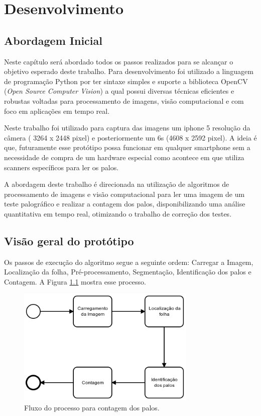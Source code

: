  \chapter{Desenvolvimento}
\label{cap:desenv}

\section{Abordagem Inicial}
\label{sec:abord-ini} 
Neste capítulo será abordado todos os passos realizados para se alcançar o objetivo esperado deste trabalho. Para desenvolvimento foi utilizado a linguagem de programação Python por  ter sintaxe simples e suporte a biblioteca OpenCV (\textit{Open Source Computer Vision}) a qual possui diversas técnicas eficientes  e robustas voltadas para processamento de imagens, visão computacional e com  foco em aplicações em tempo real.

Neste trabalho foi utilizado para captura das imagens um iphone 5 resolução da câmera ( 3264 x 2448 pixel) e posteriormente um 6s (4608 x 2592 pixel). A ideia é que, futuramente esse protótipo possa funcionar em qualquer smartphone sem a necessidade de compra de um hardware especial como acontece em \cite{skip2018} que utiliza scanners específicos para ler os palos.

A abordagem deste trabalho é direcionada na utilização de algoritmos de processamento de imagens e visão computacional para ler uma imagem de um teste palográfico e realizar a contagem dos palos, disponibilizando uma análise quantitativa em tempo real, otimizando o trabalho de correção dos testes.

\section{Visão geral do protótipo}
\label{sec:visao-geral}

Os passos de execução  do algoritmo segue a seguinte ordem:
Carregar a Imagem, Localização da folha, Pré-processamento, Segmentação, Identificação dos palos e Contagem. A Figura \ref{fig:visao-geral} mostra esse processo.

\begin{figure}[H]
 \centering
 \includegraphics[width=0.76\textwidth]{./fig/desenvolvimento/visao-geral}
 \caption{Fluxo do processo para contagem dos palos.}
 \label{fig:visao-geral}
\end{figure}

